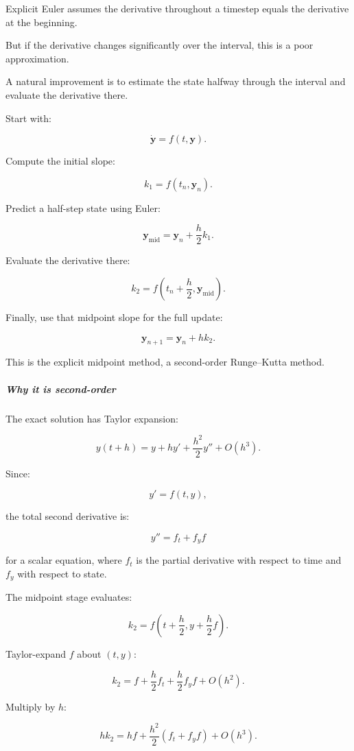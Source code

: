 Explicit Euler assumes the derivative throughout a timestep equals the derivative at the beginning.

But if the derivative changes significantly over the interval, this is a poor approximation.

A natural improvement is to estimate the state halfway through the interval and evaluate the derivative there.

Start with:

\[
\dot{\mathbf y}=f(t,\mathbf y).
\]

Compute the initial slope:

\[
k_1=f(t_n,\mathbf y_n).
\]

Predict a half-step state using Euler:

\[
\mathbf y_{\mathrm{mid}} = \mathbf y_n+\frac h2k_1.
\]

Evaluate the derivative there:

\[
k_2=f\left(t_n+\frac h2,\mathbf y_{\mathrm{mid}}\right).
\]

Finally, use that midpoint slope for the full update:

\[
\boxed{ \mathbf y_{n+1}=\mathbf y_n+hk_2 }.
\]

This is the explicit midpoint method, a second-order Runge--Kutta method.

\subparagraph{Why it is second-order}\label{02-foundations-ii-ch025-why-it-is-second-order}

\hypertarget{02-foundations-ii-ch025-why-it-is-second-order}{}

The exact solution has Taylor expansion:

\[
y(t+h) = y+hy'+\frac{h^2}{2}y''+O(h^3).
\]

Since:

\[
y'=f(t,y),
\]

the total second derivative is:

\[
y''=f_t+f_yf
\]

for a scalar equation, where \(f_t\) is the partial derivative with respect to time and \(f_y\) with respect to state.

The midpoint stage evaluates:

\[
k_2=f\left(t+\frac h2,y+\frac h2f\right).
\]

Taylor-expand \(f\) about \((t,y)\):

\[
k_2 = f+\frac h2f_t+\frac h2f_yf+O(h^2).
\]

Multiply by \(h\):

\[
hk_2 = hf+\frac{h^2}{2}(f_t+f_yf)+O(h^3).
\]

